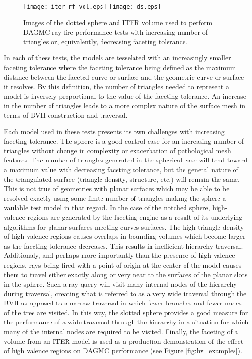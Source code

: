 \begin{figure}[H]
    \texttt{[image: iter\_rf\_vol.eps]}
    \texttt{[image: ds.eps]}
\begin{center}
  \caption{Images of the slotted sphere and ITER volume used to perform DAGMC
    ray fire performance tests with increasing number of triangles or,
    equivalently, decreasing faceting tolerance.}
\end{center}
\label{fig:sj_hv_test_models}
\end{figure} 

In each of these tests, the models are tesselated with an increasingly smaller
faceting tolerance where the faceting tolerance being defined as the maximum
distance between the faceted curve or surface and the geometric curve or surface
it resolves.  By this definition, the number of triangles needed to represent a
model is inversely proportional to the value of the faceting tolerance. An
increase in the number of triangles leads to a more complex nature of the
surface mesh in terms of BVH construction and traversal.

Each model used in these tests presents its own challenges with increasing
faceting tolerance. The sphere is a good control case for an increasing number
of triangles without change in complexity or exacerbation of pathological mesh
features. The number of triangles generated in the spherical case will tend
toward a maximum value with decreasing faceting tolerance, but the general
nature of the triangulated surface (triangle density, structure, etc.)  will
remain the same. This is not true of geometries with planar surfaces which may
be able to be resolved exactly using some finite number of triangles making the
sphere a vaulable test model in that regard. In the case of the notched sphere,
high-valence regions are generated by the faceting engine as a result of its
underlying algorithms for planar surfaces meeting curves surfaces. The high
triangle density of high valence regions causes overlaps in bounding volumes
which become larger as the faceting tolerance decreases. This results in
inefficient hierarchy traversal. Additionaly, and perhaps more importantly than
the presence of high valence regions, rays being fired with a point of origin at
the center of the model causes them to travel either exactly along or very near
to the surfaces of the planar slots in the sphere. Such a ray query will visit
many internal nodes of the hierarchy during traversal, creating what is referred
to as a very wide traversal through the BVH as opposed to a narrow traversal in
which fewer branches and fewer nodes of the tree are visited. In this way, the
slotted sphere provides a good measure for the performance of a wide traversal
through the hierarchy in a situation for which many of the internal nodes are
required to be visited. Finally, the faceting of a volume from an ITER model is
used as a production demonstration of the effect of high valence regions on
DAGMC performance (see Figure \ref{fig:hv_examples}).

